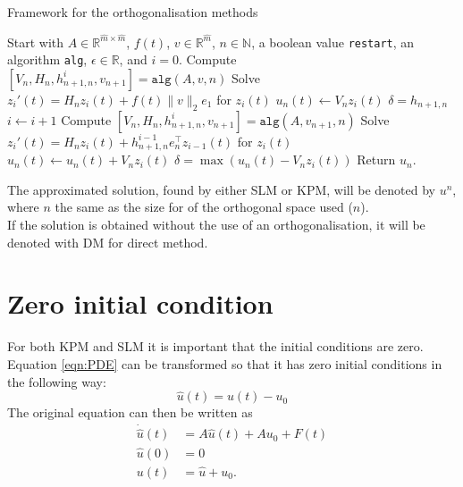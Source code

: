 \begin{algorithm}[h]
\begin{algorithmic} \caption{Framework for the orthogonalisation methods\cite{min}} \label{alg:PM} 
\STATE Start with $A \in \mathbb{R}^{\hat{m} \times \hat{m}}$, $f(t)$, $v \in \mathbb{R}^{\hat{m}}$, $n \in \mathbb{N}$, a boolean value \texttt{restart}, an algorithm \texttt{alg}, $\epsilon \in \mathbb{R}$, and $i = 0$.
\STATE Compute $[V_n,H_n,h_{n+1,n}^i,v_{n+1}] = \texttt{alg}(A,v,n)$
\STATE Solve $  z_i'(t) = H_n z_i(t) + f(t) \| v \|_2 e_1  $ for $z_i(t)$
\STATE $ u_n(t) \leftarrow  V_n z_i(t) $
\STATE $ \delta = h_{n+1,n} $ 
	\WHILE{ $\epsilon < \delta$  } 
    		\STATE $i \leftarrow i + 1$
    		\STATE Compute $[V_n,H_n,h_{n+1,n}^i,v_{n+1}] = \texttt{alg}(A,v_{n+1},n)$
    		\STATE Solve $ z_i'(t) = H_n z_i(t) + h_{n+1,n}^{i-1}e_n^\top z_{i-1}(t)  $ for $z_i(t)$
    		\STATE $ u_n(t) \leftarrow u_n(t) + V_n z_i(t) $
    		\STATE $\delta = \max(u_n(t) - V_n z_i(t))$
	\ENDWHILE
\ENDIF
\STATE Return $u_n$.
\end{algorithmic} 
\end{algorithm}

The approximated solution, found by either SLM or KPM, will be denoted by $u^n$, where $n$ the same as the size for of the orthogonal space used ($n$). \\

If the solution is obtained without the use of an orthogonalisation, it will be denoted with DM for direct method.


\section{Zero initial condition}
For both KPM and SLM it is important that the initial conditions are zero. Equation \eqref{eqn:PDE} can be transformed so that it has zero initial conditions in the following way:
\begin{equation*}
\hat{u}(t) = u(t)-u_0
\end{equation*}
The original equation can then be written as
\begin{equation}
\begin{aligned}
\dot{\hat{u}}(t) &= A \hat{u}(t) +A u_0 + F(t) \\
 \hat{u}(0)&= 0 \\
 u(t) &= \hat{u} + u_0. \\
\end{aligned}
\end{equation}

